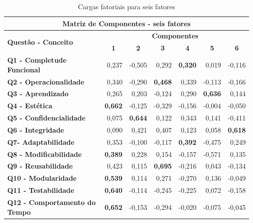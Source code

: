 \begin{apendicesenv}
    \begin{longtable}{rrrrrrr}
     \caption{Cargas fatoriais para seis fatores}
     \label{6-fatores}\\
    \hline
    \multicolumn{7}{c}{\textbf{Matriz de Componentes - seis fatores}} \\
    \hline
    \multicolumn{1}{l}{\multirow{2}[4]{*}{\textbf{Questão - Conceito}}} & \multicolumn{6}{c}{\textbf{Componentes}} \\
    \multicolumn{1}{l}{} & \multicolumn{1}{c}{\textbf{1}} & \multicolumn{1}{c}{\textbf{2}} & \multicolumn{1}{c}{\textbf{3}} & \multicolumn{1}{c}{\textbf{4}} & \multicolumn{1}{c}{\textbf{5}} & \multicolumn{1}{c}{\textbf{6}} \\
    \multicolumn{1}{l}{\textbf{Q1 - Completude Funcional}} & 0,237 & -0,505 & 0,292 & \textbf{0,320} & 0,019 & -0,116 \\
    \multicolumn{1}{l}{\textbf{Q2 - Operacionalidade}} & 0,340 & -0,290 & \textbf{0,468} & 0,339 & -0,113 & -0,166 \\
    \multicolumn{1}{l}{\textbf{Q3 - Aprendizado}} & 0,265 & 0,203 & -0,124 & 0,290 & \textbf{0,636} & 0,144 \\
    \multicolumn{1}{l}{\textbf{Q4 - Estética}} & \textbf{0,662} & -0,125 & -0,329 & -0,156 & -0,004 & -0,050 \\
    \multicolumn{1}{l}{\textbf{Q5 - Confidencialidade}} & 0,075 & \textbf{0,644} & 0,122 & 0,343 & 0,141 & -0,411 \\
    \multicolumn{1}{l}{\textbf{Q6 - Integridade}} & 0,090 & 0,421 & 0,407 & 0,123 & 0,058 & \textbf{0,618} \\
    \multicolumn{1}{l}{\textbf{Q7- Adaptabilidade}} & 0,353 & -0,100 & -0,117 & \textbf{0,392} & -0,475 & 0,249 \\
    \multicolumn{1}{l}{\textbf{Q8 - Modificabilidade}} & \textbf{0,389} & 0,228 & 0,154 & -0,157 & -0,571 & 0,135 \\
    \multicolumn{1}{l}{\textbf{Q9 - Reusabilidade}} & 0,423 & 0,115 & \textbf{0,695} & -0,216 & 0,043 & -0,134 \\
    \multicolumn{1}{l}{\textbf{Q10 - Modularidade}} & \textbf{0,539} & 0,114 & 0,271 & -0,270 & 0,136 & -0,049 \\
    \multicolumn{1}{l}{\textbf{Q11 - Testabilidade}} & \textbf{0,640} & -0,114 & -0,245 & -0,225 & 0,072 & -0,158 \\
    \multicolumn{1}{l}{\textbf{Q12 - Comportamento do Tempo}} & \textbf{0,652} & -0,153 & -0,294 & -0,020 & -0,075 & -0,045 \\

\end{longtable}
\end{apendicesenv}
